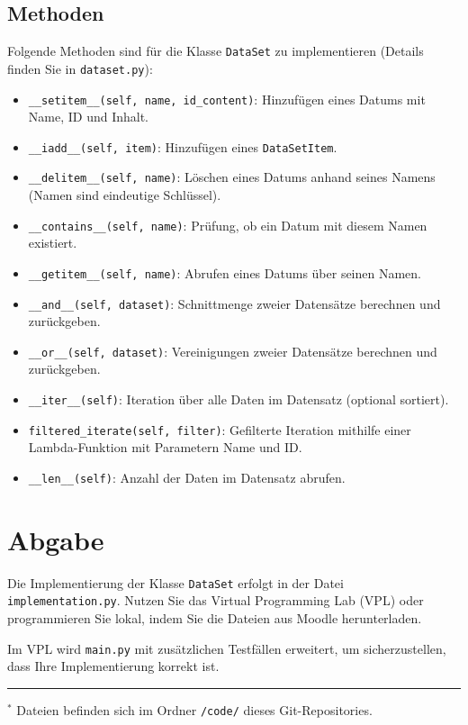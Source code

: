 \documentclass[a4paper,12pt]{article}
\begin{document}
\subsection{Methoden}
Folgende Methoden sind für die Klasse \texttt{DataSet} zu implementieren (Details finden Sie in \texttt{dataset.py}):

\begin{itemize}
    \item \texttt{\_\_setitem\_\_(self, name, id\_content)}: Hinzufügen eines Datums mit Name, ID und Inhalt.
    \item \texttt{\_\_iadd\_\_(self, item)}: Hinzufügen eines \texttt{DataSetItem}.
    \item \texttt{\_\_delitem\_\_(self, name)}: Löschen eines Datums anhand seines Namens (Namen sind eindeutige Schlüssel).
    \item \texttt{\_\_contains\_\_(self, name)}: Prüfung, ob ein Datum mit diesem Namen existiert.
    \item \texttt{\_\_getitem\_\_(self, name)}: Abrufen eines Datums über seinen Namen.
    \item \texttt{\_\_and\_\_(self, dataset)}: Schnittmenge zweier Datensätze berechnen und zurückgeben.
    \item \texttt{\_\_or\_\_(self, dataset)}: Vereinigungen zweier Datensätze berechnen und zurückgeben.
    \item \texttt{\_\_iter\_\_(self)}: Iteration über alle Daten im Datensatz (optional sortiert).
    \item \texttt{filtered\_iterate(self, filter)}: Gefilterte Iteration mithilfe einer Lambda-Funktion mit Parametern Name und ID.
    \item \texttt{\_\_len\_\_(self)}: Anzahl der Daten im Datensatz abrufen.
\end{itemize}

\section{Abgabe}
Die Implementierung der Klasse \texttt{DataSet} erfolgt in der Datei \texttt{implementation.py}. Nutzen Sie das Virtual Programming Lab (VPL) oder programmieren Sie lokal, indem Sie die Dateien aus Moodle herunterladen.

Im VPL wird \texttt{main.py} mit zusätzlichen Testfällen erweitert, um sicherzustellen, dass Ihre Implementierung korrekt ist.

\vfill
\hrule
\footnotesize{$^*$ Dateien befinden sich im Ordner \texttt{/code/} dieses Git-Repositories.}
\end{document}

